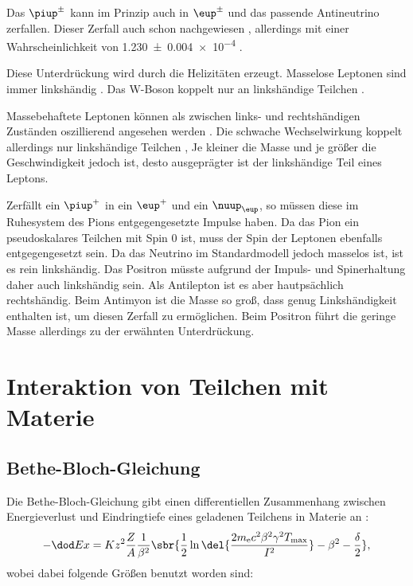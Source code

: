 \documentclass[11pt, ngerman, fleqn, DIV=15, headinclude, BCOR=2cm]{scrreprt}
\begin{document}
Das $\piup^\pm$ kann im Prinzip auch in $\eup^\pm$ und das passende
Antineutrino zerfallen. Dieser Zerfall auch schon nachgewiesen
\parencite{Fazzini/Electron_Pion}, allerdings mit einer Wahrscheinlichkeit von
\num{1.230 +- 0.004 e-4} \parencite[3]{Amsler/Pi_pm}.

Diese Unterdrückung wird durch die Helizitäten erzeugt. Masselose Leptonen sind
immer linkshändig \parencite{Wikipedia/Pion}. Das W-Boson koppelt nur an
linkshändige Teilchen \parencite[156]{Povh/Teilchen_Kerne}.

Massebehaftete Leptonen können als zwischen links- und rechtshändigen Zuständen
oszillierend angesehen werden \parencite[Fig.~25.1]{penrose-road_to_reality}.
Die schwache Wechselwirkung koppelt allerdings nur linkshändige Teilchen
\parencite[Fig.~25.4]{penrose-road_to_reality}, Je kleiner die Masse und je
größer die Geschwindigkeit jedoch ist, desto ausgeprägter ist der linkshändige
Teil eines Leptons.

Zerfällt ein $\piup^+$ in ein $\eup^+$ und ein $\nuup_\eup$, so müssen diese im
Ruhesystem des Pions entgegengesetzte Impulse haben. Da das Pion ein
pseudoskalares Teilchen mit Spin 0 ist, muss der Spin der Leptonen ebenfalls
entgegengesetzt sein. Da das Neutrino im Standardmodell jedoch masselos ist,
ist es rein linkshändig. Das Positron müsste aufgrund der Impuls- und
Spinerhaltung daher auch linkshändig sein. Als Antilepton ist es aber
hautpsächlich rechtshändig. Beim Antimyon ist die Masse so groß, dass genug
Linkshändigkeit enthalten ist, um diesen Zerfall zu ermöglichen. Beim Positron
führt die geringe Masse allerdings zu der erwähnten Unterdrückung.

\section{Interaktion von Teilchen mit Materie}

\subsection{Bethe-Bloch-Gleichung}
\label{sec:bethe-bloch}

Die Bethe-Bloch-Gleichung gibt einen differentiellen Zusammenhang zwischen
Energieverlust und Eindringtiefe eines geladenen Teilchens in Materie an
\parencite[(4.6)]{Grupen/Astroteilchenphysik}:
\[
    - \dod Ex = K z^2 \frac ZA \frac{1}{\beta^2} \sbr{\frac 12
        \ln\del{\frac{2m_\text e c^2 \beta^2 \gamma^2 T_\text{max}}{I^2}} -
    \beta^2 - \frac\delta2},
\]
wobei dabei folgende Größen benutzt worden sind:
\end{document}
